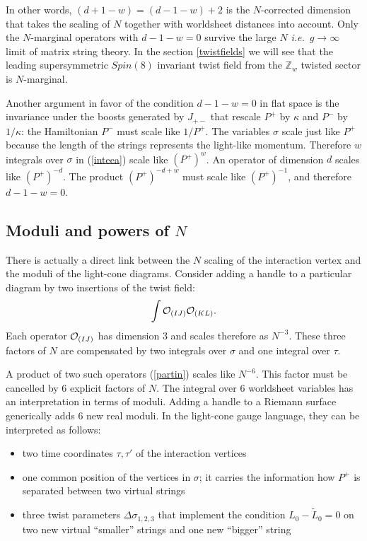 \documentclass[nohyper,12pt,letterpaper]{JHEP3}
\def\IZ{{\mathbb Z}}           %
\def\calO{{\cal O}}
\def \tilde{\widetilde}
\def \eqref#1{(\ref{#1})}
\def \eqn#1#2{\begin{equation}#2\label{#1}\end{equation}}
\begin{document}
In other words, $(d+1-w)=(d-1-w)+2$ is the $N$-corrected dimension
that takes the scaling of $N$ together with worldsheet distances into
account. Only the $N$-marginal operators with $d-1-w=0$ survive the
large $N$ {\it i.e.}\ $g\to\infty$ limit of matrix string theory. In the
section \ref{twistfields} we will see that the leading supersymmetric
$Spin(8)$ invariant twist field from the $\IZ_w$ twisted sector is
$N$-marginal.

Another argument in favor of the condition $d-1-w=0$ in flat space is
the invariance under the boosts generated by $J_{+-}$ that rescale
$P^+$ by $\kappa$ and $P^-$ by $1/\kappa$: the Hamiltonian $P^-$ must
scale like $1/P^+$. The variables $\sigma$ scale just like $P^+$
because the length of the strings represents the light-like momentum.
Therefore $w$ integrals over $\sigma$ in \eqref{inteea} scale like
$(P^+)^w$.  An operator of dimension $d$ scales like $(P^+)^{-d}$. The
product $(P^+)^{-d+w}$ must scale like $(P^+)^{-1}$, and therefore
$d-1-w=0$.

\subsection{Moduli and powers of $N$}

There is actually a direct link between the $N$ scaling of the interaction 
vertex and the moduli of the light-cone diagrams. Consider adding a handle
to a particular diagram by two insertions of the twist field:
\eqn{partin}{\int \calO_{(IJ)}\calO_{(KL)}.}
Each operator $\calO_{(IJ)}$ has dimension $3$ and scales therefore as 
$N^{-3}$. These three factors of $N$ are compensated by two integrals over 
$\sigma$ and one integral over $\tau$.

A product of two such operators \eqref{partin} scales like $N^{-6}$. This 
factor must be cancelled by $6$ explicit factors of $N$. The integral over 
$6$ worldsheet variables has an interpretation in terms of moduli. Adding 
a handle to a Riemann surface generically adds $6$ new real moduli. In the 
light-cone gauge language, they can be interpreted as follows:

\begin{itemize}
\item two time coordinates $\tau,\tau'$ of the interaction vertices
\item one common position of the vertices in $\sigma$; it carries the 
information how $P^+$ is separated between two virtual strings
\item three twist parameters $\Delta \sigma_{1,2,3}$ that implement the 
condition $L_0-\tilde L_0=0$ on two new virtual ``smaller'' strings and 
one new ``bigger'' string
\end{itemize}
\end{document}
